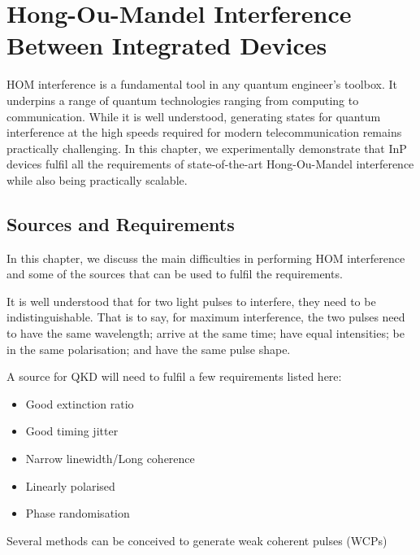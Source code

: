 %
%
\glsresetall
\graphicspath{{./chapters/chapter03/fig03/}}

\let\textcircled=\pgftextcircled
\chapter{Hong-Ou-Mandel Interference Between Integrated Devices}
\label{chap:hom}

\ac{HOM} interference is a fundamental tool in any quantum engineer's toolbox. It underpins a range of quantum technologies ranging from computing to communication. While it is well understood, generating states for quantum interference at the high speeds required for modern telecommunication remains practically challenging. In this chapter, we experimentally demonstrate that \ac{InP} devices fulfil all the requirements of state-of-the-art Hong-Ou-Mandel interference while also being practically scalable. 

\section{Sources and Requirements}
\label{sec:sources}

In this chapter, we discuss the main difficulties in performing	\ac{HOM} interference and some of the sources that can be used to fulfil the requirements. 

It is well understood that for two light pulses to interfere, they need to be indistinguishable. That is to say, for maximum interference, the two pulses need to have the same wavelength; arrive at the same time; have equal intensities; be in the same polarisation; and have the same pulse shape.

A source for \ac{QKD} will need to fulfil a few requirements listed here:

\begin{itemize}
	\item Good extinction ratio
	\item Good timing jitter
	\item Narrow linewidth/Long coherence
	\item Linearly polarised
	\item Phase randomisation
\end{itemize}

Several methods can be conceived to generate weak coherent pulses (WCPs)


